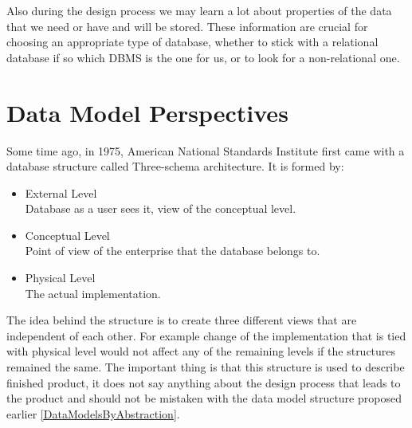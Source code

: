 Also during the design process we may learn a lot about properties of the data that we need or have and will be stored. These information are crucial for choosing an appropriate type of database, whether to stick with a relational database if so which DBMS is the one for us, or to look for a non-relational one. \\


\section{Data Model Perspectives}

Some time ago, in 1975, American National Standards Institute \cite{ANSIArchitecture75} first came with a database structure called Three-schema architecture. It is formed by:
\begin{itemize}
	\item External Level \\ Database as a user sees it, view of the conceptual level. 
	\item Conceptual Level \\ Point of view of the enterprise that the database belongs to.
	\item Physical Level \\ The actual implementation.
\end{itemize}

The idea behind the structure is to create three different views that are independent of each other. For example change of the implementation that is tied with physical level would not affect any of the remaining levels if the structures remained the same. The important thing is that this structure is used to describe finished product, it does not say anything about the design process that leads to the product and should not be mistaken with the data model structure proposed earlier \ref{DataModelsByAbstraction}.\\

